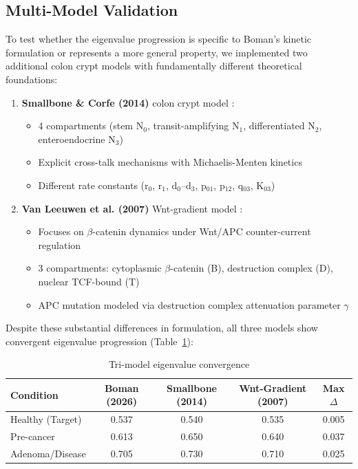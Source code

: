 \documentclass[11pt,a4paper]{article}
\begin{document}
\subsection{Multi-Model Validation}

To test whether the eigenvalue progression is specific to Boman's kinetic formulation or represents a more general property, we implemented two additional colon crypt models with fundamentally different theoretical foundations:

\begin{enumerate}
    \item \textbf{Smallbone \& Corfe (2014)} colon crypt model \citep{smallbone2014crosstalk}:
    \begin{itemize}
        \item 4 compartments (stem N$_0$, transit-amplifying N$_1$, differentiated N$_2$, enteroendocrine N$_3$)
        \item Explicit cross-talk mechanisms with Michaelis-Menten kinetics
        \item Different rate constants (r$_0$, r$_1$, d$_0$--d$_3$, p$_{01}$, p$_{12}$, q$_{03}$, K$_{03}$)
    \end{itemize}
    
    \item \textbf{Van Leeuwen et al. (2007)} Wnt-gradient model \citep{vanleeuwen2007wnt}:
    \begin{itemize}
        \item Focuses on $\beta$-catenin dynamics under Wnt/APC counter-current regulation
        \item 3 compartments: cytoplasmic $\beta$-catenin (B), destruction complex (D), nuclear TCF-bound (T)
        \item APC mutation modeled via destruction complex attenuation parameter $\gamma$
    \end{itemize}
\end{enumerate}

Despite these substantial differences in formulation, all three models show convergent eigenvalue progression (Table~\ref{tab:multimodel}):

\begin{table}[H]
\centering
\caption{Tri-model eigenvalue convergence}
\label{tab:multimodel}
\begin{tabular}{lcccc}
\toprule
Condition & Boman (2026) & Smallbone (2014) & Wnt-Gradient (2007) & Max $\Delta$ \\
\midrule
Healthy (Target) & 0.537 & 0.540 & 0.535 & 0.005 \\
Pre-cancer & 0.613 & 0.650 & 0.640 & 0.037 \\
Adenoma/Disease & 0.705 & 0.730 & 0.710 & 0.025 \\
\bottomrule
\end{tabular}
\end{table}
\end{document}
